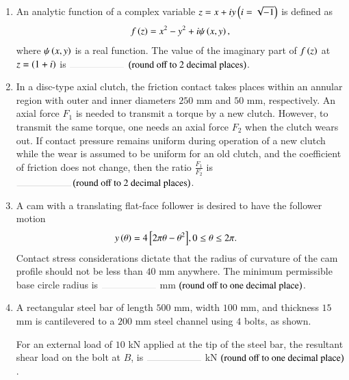 \documentclass[journal,12pt,onecolumn]{IEEEtran}
\theoremstyle{remark}
\begin{document}
\begin{enumerate}[start=27]
\item An analytic function of a complex variable $z = x + iy \left(i=\sqrt{-1}\right)$ is defined as
\begin{align*}
f\left(z\right) = x^2 - y^2 + i\psi\left(x,y\right),
\end{align*}
where $\psi\left(x,y\right)$ is a real function. The value of the imaginary part of $f\left(z\right)$ at $z=\left(1+i\right)$ is $\rule{2cm}{0.1pt}$ $\left(\text{round off to 2 decimal places}\right)$.
\hfill{}

\item In a disc-type axial clutch, the friction contact takes places within an annular region with outer and inner diameters $250$ mm and $50$ mm, respectively. An axial force $F_1$ is needed to transmit a torque by a new clutch. However, to transmit the same torque, one needs an axial force $F_2$ when the clutch wears out. If contact pressure remains uniform during operation of a new clutch while the wear is assumed to be uniform for an old clutch, and the coefficient of friction does not change, then the ratio $\frac{F_1}{F_2}$ is $\rule{2cm}{0.1pt}\brak{\text{round off to 2 decimal places}}$.
\hfill{}

\item A cam with a translating flat-face follower is desired to have the follower motion
\begin{align*}
y\left(\theta\right) = 4{}\left[2\pi\theta - \theta^2\right] &, 0 \leq \theta \leq 2\pi.
\end{align*}
Contact stress considerations dictate that the radius of curvature of the cam profile should not be less than $40$ mm anywhere. The minimum permissible base circle radius is $\rule{2cm}{0.1pt}$ mm $\left(\text{round off to one decimal place}\right)$.
\hfill{}

\item A rectangular steel bar of length $500$ mm, width $100$ mm, and thickness $15$ mm is cantilevered to a $200$ mm steel channel using $4$ bolts, as shown.
\begin{center}

\end{center}
For an external load of $10$ kN applied at the tip of the steel bar, the resultant shear load on the bolt at $B$, is $\rule{2cm}{0.1pt}$ kN $\left(\text{round off to one decimal place}\right)$.
\hfill{}


\end{enumerate}
\end{document}
